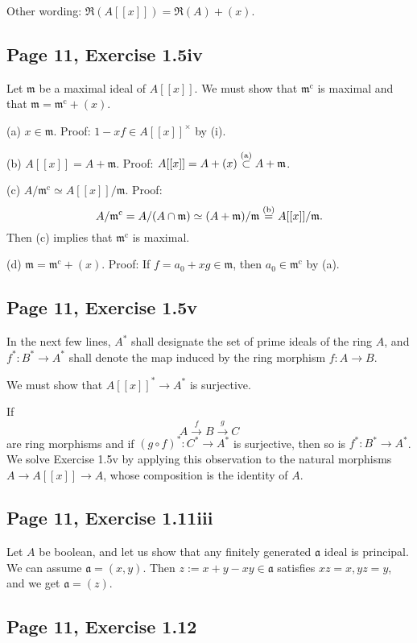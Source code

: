 \documentclass[parskip=half,fontsize=12pt]{scrartcl}%
\newcommand{\oo}{\operatorname}\newcommand{\ooo}{\operatorname*}
\newcommand{\mf}{\mathfrak}
\newcommand{\aaa}{\mf a}
\begin{document}
Other wording: $\mf R(A[[x]])=\mf R(A)+(x)$.

\subsection{Page 11, Exercise 1.5iv}

Let $\mf m$ be a maximal ideal of $A[[x]]$. We must show that $\mf m^{\oo c}$ is maximal and that $\mf m=\mf m^{\oo c}+(x)$.

(a) $x\in\mf m$. Proof: $1-xf\in A[[x]]^\times$ by (i).

(b) $A[[x]]=A+\mf m$. Proof: $A[[x]]=A+(x)\overset{(\text a)}\subset A+\mf m$.

(c) $A/\mf m^{\oo c}\simeq A[[x]]/\mf m$. Proof: 
$$
A/\mf m^{\oo c}=A/(A\cap\mf m)\simeq(A+\mf m)/\mf m\overset{(\text b)}=A[[x]]/\mf m.
$$ 
Then (c) implies that $\mf m^{\oo c}$ is maximal.

(d) $\mf m=\mf m^{\oo c}+(x)$. Proof: If $f=a_0+xg\in\mf m$, then $a_0\in\mf m^{\oo c}$ by (a).

\subsection{Page 11, Exercise 1.5v}%

In the next few lines, $A^*$ shall designate the set of prime ideals of the ring $A$, and $f^*:B^*\to A^*$ shall denote the map induced by the ring morphism $f:A\to B$. 

We must show that $A[[x]]^*\to A^*$ is surjective.

If 
$$
A\xrightarrow fB\xrightarrow gC
$$ 
are ring morphisms and if $(g\circ f)^*:C^*\to A^*$ is surjective, then so is $f^*:B^*\to A^*$. We solve Exercise 1.5v by applying this observation to the natural morphisms $A\to A[[x]]\to A$, whose composition is the identity of $A$.

\subsection{Page 11, Exercise 1.11iii}%

Let $A$ be boolean, and let us show that any finitely generated $\aaa$ ideal is principal. We can assume $\aaa=(x,y)$. Then $z:=x+y-xy\in\aaa$ satisfies $xz=x,yz=y$, and we get $\aaa=(z)$.

\subsection{Page 11, Exercise 1.12}%
\end{document}
